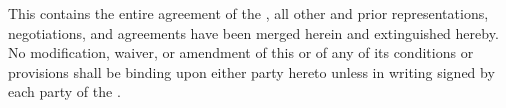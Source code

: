 This \lease contains the entire agreement of the \parties, all other and prior representations, negotiations, and agreements have been merged herein and extinguished hereby. No modification, waiver, or amendment of this \lease or of any of its conditions or provisions shall be binding upon either party hereto unless in writing signed by each party of the \parties.
